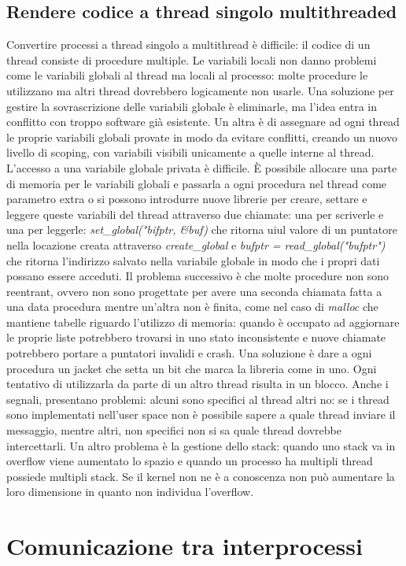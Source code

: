 \subsection{Rendere codice a thread singolo multithreaded}
Convertire processi a thread singolo a multithread \`e difficile: il codice di un thread consiste di procedure multiple. Le variabili locali non danno problemi come le variabili globali
al thread ma locali al processo: molte procedure le utilizzano ma altri thread dovrebbero logicamente non usarle. Una soluzione per gestire la sovrascrizione delle variabili globale \`e
eliminarle, ma l'idea entra in conflitto con troppo software gi\`a esistente. Un altra \`e di assegnare ad ogni thread le proprie variabili globali provate in modo da evitare conflitti,
creando un nuovo livello di scoping, con variabili visibili unicamente a quelle interne al thread. L'accesso a una variabile globale privata \`e difficile. \`E possibile allocare una 
parte di memoria per le variabili globali e passarla a ogni procedura nel thread come parametro extra o si possono introdurre nuove librerie per creare, settare e leggere queste
variabili del thread attraverso due chiamate: una per scriverle e una per leggerle: \emph{set\_global("bifptr, \&buf)} che ritorna uiul valore di un puntatore nella locazione creata
attraverso \emph{create\_global} e \emph{bufptr = read\_global("bufptr")} che ritorna l'indirizzo salvato nella variabile globale in modo che i propri dati possano essere acceduti. Il
problema successivo \`e che molte procedure non sono reentrant, ovvero non sono progettate per avere una seconda chiamata fatta a una data procedura mentre un'altra non \`e finita, come
nel caso di \emph{malloc} che mantiene tabelle riguardo l'utilizzo di memoria: quando \`e occupato ad aggiornare le proprie liste potrebbero trovarsi in uno stato inconsistente e nuove 
chiamate potrebbero portare a puntatori invalidi e crash. Una soluzione \`e dare a ogni procedura un jacket che setta un bit che marca la libreria come in uno. Ogni tentativo di 
utilizzarla da parte di un altro thread risulta in un blocco. Anche i segnali, presentano problemi: alcuni sono specifici al thread altri no: se i thread sono implementati nell'user
space non \`e possibile sapere a quale thread inviare il messaggio, mentre altri, non specifici non si sa quale thread dovrebbe intercettarli. Un altro problema \`e la gestione dello 
stack: quando uno stack va in overflow viene aumentato lo spazio e quando un processo ha multipli thread possiede multipli stack. Se il kernel non ne \`e a conoscenza non pu\`o aumentare
la loro dimensione in quanto non individua l'overflow. 
\section{Comunicazione tra interprocessi}

